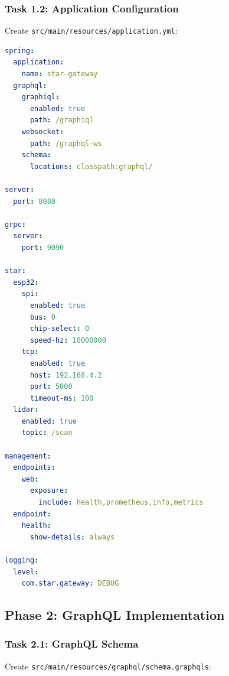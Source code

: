 \documentclass[11pt,letterpaper]{article}
\begin{document}
\subsubsection{Task 1.2: Application Configuration}

Create \texttt{src/main/resources/application.yml}:

\begin{lstlisting}[language=yaml, caption=application.yml]
spring:
  application:
    name: star-gateway
  graphql:
    graphiql:
      enabled: true
      path: /graphiql
    websocket:
      path: /graphql-ws
    schema:
      locations: classpath:graphql/

server:
  port: 8080

grpc:
  server:
    port: 9090

star:
  esp32:
    spi:
      enabled: true
      bus: 0
      chip-select: 0
      speed-hz: 10000000
    tcp:
      enabled: true
      host: 192.168.4.2
      port: 5000
      timeout-ms: 100
  lidar:
    enabled: true
    topic: /scan

management:
  endpoints:
    web:
      exposure:
        include: health,prometheus,info,metrics
  endpoint:
    health:
      show-details: always

logging:
  level:
    com.star.gateway: DEBUG
\end{lstlisting}

\subsection{Phase 2: GraphQL Implementation}

\subsubsection{Task 2.1: GraphQL Schema}

Create \texttt{src/main/resources/graphql/schema.graphqls}:
\end{document}
